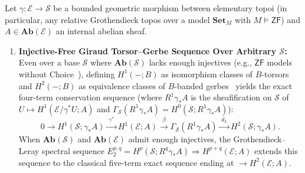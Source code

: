 \begin{theorem}\label{thm:quantitative-conservation}%
%

Let $\gamma : \mathcal{E} \to \mathcal{S}$ be a bounded geometric morphism between elementary topoi (in particular, any relative Grothendieck topos over a model $\mathbf{Set}_M$ with $M \models \mathsf{ZF}$) and $A \in \mathbf{Ab}(\mathcal{E})$ an internal abelian sheaf.

\begin{enumerate}

  \item \textbf{Injective-Free Giraud Torsor--Gerbe Sequence Over Arbitrary $\mathcal{S}$:} Even over a base $\mathcal{S}$ where $\mathbf{Ab}(\mathcal{S})$ lacks enough injectives (e.g., $\mathsf{ZF}$ models without Choice~\cite[Theorem~1.1]{Blass79}), defining $H^1(-; B)$ as isomorphism classes of $B$-torsors and $H^2(-; B)$ as equivalence classes of $B$-banded gerbes~\cite[Chs.~IV--V]{Giraud71} yields the exact four-term conservation sequence (where $R^1\gamma_* A$ is the sheafification on $\mathcal{S}$ of $U \mapsto H^1(\mathcal{E}/{\gamma^*U}; A)$ and $\Gamma_{\mathcal{S}}(R^1\gamma_* A) = H^0(\mathcal{S}; R^1\gamma_* A)$):
  \[
    0 \longrightarrow H^1(\mathcal{S}; \gamma_* A) \xrightarrow{\;\gamma^*\;} H^1(\mathcal{E}; A) \xrightarrow{\;\beta\;} \Gamma_{\mathcal{S}}(R^1\gamma_* A) \xrightarrow{\;d_2\;} H^2(\mathcal{S}; \gamma_* A).
  \]
  When $\mathbf{Ab}(\mathcal{S})$ and $\mathbf{Ab}(\mathcal{E})$ admit enough injectives, the Grothendieck--Leray spectral sequence $E_2^{p,q} = H^p(\mathcal{S}; R^q\gamma_* A) \Longrightarrow H^{p+q}(\mathcal{E}; A)$ extends this sequence to the classical five-term exact sequence ending at $\to H^2(\mathcal{E}; A)$.


\end{enumerate}
\end{theorem}
